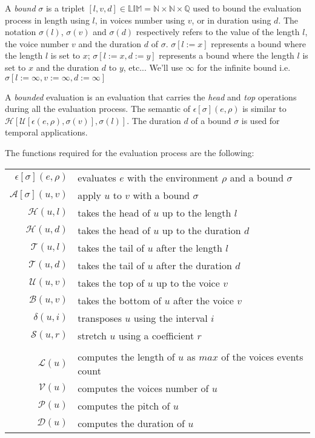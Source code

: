 \documentclass[10pt,a4paper,frenchb]{article}
\newcommand{\bounddomain}{\mathbb{LIM}}
\newcommand{\ebounddomain}{\mathbb{N} \times \mathbb{N} \times \mathbb{Q}}
\newcommand{\evalsym}{\epsilon}
\newcommand{\eval}[2][\bounds]{\evalsym[#1](#2,\rho)}
\newcommand{\evalsimple}[1]{\evalsym(#1,\rho)}
\newcommand{\envsym}{\rho}
\newcommand{\apply}[1][\bounds]	{{\mathcal A}[#1]}
\newcommand{\length}		{{\mathcal L}}
\newcommand{\voices}		{{\mathcal V}}
\newcommand{\pitch}		{{\mathcal P}}
\newcommand{\dur}			{{\mathcal D}}
\newcommand{\head}			{{\mathcal H}}
\newcommand{\tail}			{{\mathcal T}}
\renewcommand{\top}		{{\mathcal U}}
\newcommand{\bottom}		{{\mathcal B}}
\newcommand{\transp}		{\delta}
\renewcommand{\stretch}	{{\mathcal S}}
\newcommand{\bounds}		{\sigma}
\newcommand{\nobounds}	{\infty}
\begin{document}
A \emph{bound} $\bounds$ is a triplet $[l, v, d] \in \bounddomain = \ebounddomain$ used to bound the evaluation process in length using $l$, in voices number using $v$, or in duration using $d$. 
The notation $\bounds(l)$, $\bounds(v)$ and $\bounds(d)$ respectively refers to the value of the length $l$, the voice number $v$ and the duration $d$  of $\bounds$. $\bounds[l := x]$ represents a bound where the length $l$ is set to $x$; $\bounds[l := x, d:=y]$ represents a bound where the length $l$ is set to $x$ and the duration $d$ to $y$, etc... We'll use $\nobounds$ for the infinite bound i.e. $\bounds[l := \infty, v:= \infty, d:= \infty]$

A \emph{bounded} evaluation is an evaluation that carries the \emph{head} and \emph{top} operations during all the evaluation process. The semantic of $\eval{e}$ is similar to $\head[ \top[ \evalsimple{e}, \bounds(v)], \bounds(l)]$. The duration $d$ of a bound $\bounds$ is used for temporal applications.


The functions required for the evaluation process are the following:
\begin{center}
\begin{tabular}{rl}
 \hline
 $\eval{e}$ 				& evaluates $e$ with the environment $\envsym$ and a bound $\bounds$ \\
 $\apply(u,v)$ 			& apply $u$ to $v$ with a bound $\bounds$ \\
 $\head(u,l)$ 				& takes the head of $u$ up to the length $l$ \\
 $\head(u,d)$ 				& takes the head of $u$ up to the duration $d$ \\
 $\tail(u,l)$ 				& takes the tail of $u$ after the length $l$ \\
 $\tail(u,d)$ 		  & takes the tail of $u$ after the duration $d$ \\
 $\top(u,v)$ 				& takes the top of $u$ up to the voice $v$ \\
 $\bottom(u,v)$ 			& takes the bottom of $u$ after the voice $v$ \\
 $\transp(u,i)$ 		   & transposes $u$ using the interval $i$ \\
 $\stretch(u,r)$ 		   & stretch $u$ using a coefficient $r$ \\
\multicolumn{2}{c}{\dotfill{}} \\
 $\length(u)$ 				& computes the length of $u$ as $max$ of the voices events count \\
 $\voices(u)$ 				& computes the voices number of $u$ \\
 $\pitch(u)$ 				& computes the pitch of $u$ \\
 $\dur(u)$ 				& computes the duration of $u$ \\
 \hline
\end{tabular}
\end{center}
\end{document}

